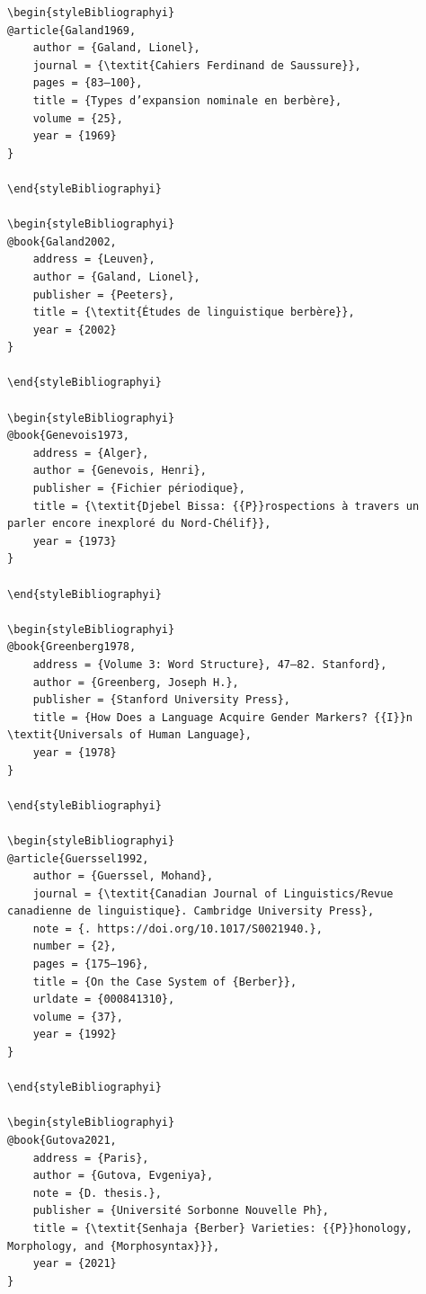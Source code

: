 \documentclass[output=paper]{langscibook}
\begin{document}
\begin{verbatim}
\begin{styleBibliographyi}
@article{Galand1969,
	author = {Galand, Lionel},
	journal = {\textit{Cahiers Ferdinand de Saussure}},
	pages = {83–100},
	title = {Types d’expansion nominale en berbère},
	volume = {25},
	year = {1969}
}

\end{styleBibliographyi}

\begin{styleBibliographyi}
@book{Galand2002,
	address = {Leuven},
	author = {Galand, Lionel},
	publisher = {Peeters},
	title = {\textit{Études de linguistique berbère}},
	year = {2002}
}

\end{styleBibliographyi}

\begin{styleBibliographyi}
@book{Genevois1973,
	address = {Alger},
	author = {Genevois, Henri},
	publisher = {Fichier périodique},
	title = {\textit{Djebel Bissa: {{P}}rospections à travers un parler encore inexploré du Nord-Chélif}},
	year = {1973}
}

\end{styleBibliographyi}

\begin{styleBibliographyi}
@book{Greenberg1978,
	address = {Volume 3: Word Structure}, 47–82. Stanford},
	author = {Greenberg, Joseph H.},
	publisher = {Stanford University Press},
	title = {How Does a Language Acquire Gender Markers? {{I}}n \textit{Universals of Human Language},
	year = {1978}
}

\end{styleBibliographyi}

\begin{styleBibliographyi}
@article{Guerssel1992,
	author = {Guerssel, Mohand},
	journal = {\textit{Canadian Journal of Linguistics/Revue canadienne de linguistique}. Cambridge University Press},
	note = {. https://doi.org/10.1017/S0021940.},
	number = {2},
	pages = {175–196},
	title = {On the Case System of {Berber}},
	urldate = {000841310},
	volume = {37},
	year = {1992}
}

\end{styleBibliographyi}

\begin{styleBibliographyi}
@book{Gutova2021,
	address = {Paris},
	author = {Gutova, Evgeniya},
	note = {D. thesis.},
	publisher = {Université Sorbonne Nouvelle Ph},
	title = {\textit{Senhaja {Berber} Varieties: {{P}}honology, Morphology, and {Morphosyntax}}},
	year = {2021}
}


\end{verbatim}
\end{document}
